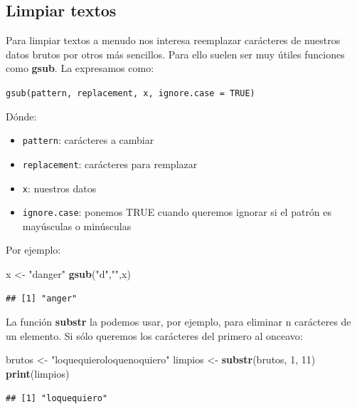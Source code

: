 \documentclass[]{book}
\newenvironment{Shaded}{\begin{snugshade}}{\end{snugshade}}
\newcommand{\KeywordTok}[1]{\textcolor[rgb]{0.13,0.29,0.53}{\textbf{{#1}}}}
\newcommand{\DecValTok}[1]{\textcolor[rgb]{0.00,0.00,0.81}{{#1}}}
\newcommand{\StringTok}[1]{\textcolor[rgb]{0.31,0.60,0.02}{{#1}}}
\newcommand{\NormalTok}[1]{{#1}}
\theoremstyle{definition}
\theoremstyle{definition}
\theoremstyle{remark}
\begin{document}
\subsection{Limpiar textos}\label{limpiar-textos}

Para limpiar textos a menudo nos interesa reemplazar carácteres de
nuestros datos brutos por otros más sencillos. Para ello suelen ser muy
útiles funciones como \textbf{gsub}. La expresamos como:

\texttt{gsub(pattern,\ replacement,\ x,\ ignore.case\ =\ TRUE)}

Dónde:

\begin{itemize}
\item
  \texttt{pattern}: carácteres a cambiar
\item
  \texttt{replacement}: carácteres para remplazar
\item
  \texttt{x}: nuestros datos
\item
  \texttt{ignore.case}: ponemos TRUE cuando queremos ignorar si el
  patrón es mayúsculas o minúsculas
\end{itemize}

Por ejemplo:

\begin{Shaded}
\begin{Highlighting}[]
\NormalTok{x <-}\StringTok{ "danger"}
\KeywordTok{gsub}\NormalTok{(}\StringTok{"d"}\NormalTok{,}\StringTok{""}\NormalTok{,x)}
\end{Highlighting}
\end{Shaded}

\begin{verbatim}
## [1] "anger"
\end{verbatim}

La función \textbf{substr} la podemos usar, por ejemplo, para eliminar n
carácteres de un elemento. Si sólo queremos los carácteres del primero
al onceavo:

\begin{Shaded}
\begin{Highlighting}[]
\NormalTok{brutos <-}\StringTok{ "loquequieroloquenoquiero"}
\NormalTok{limpios <-}\StringTok{ }\KeywordTok{substr}\NormalTok{(brutos, }\DecValTok{1}\NormalTok{, }\DecValTok{11}\NormalTok{)}
\KeywordTok{print}\NormalTok{(limpios)}
\end{Highlighting}
\end{Shaded}

\begin{verbatim}
## [1] "loquequiero"
\end{verbatim}
\end{document}
